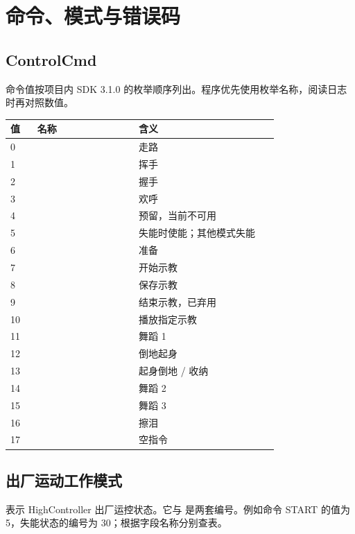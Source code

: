 \chapter{命令、模式与错误码}
\label{app:commands}
\section{ControlCmd}
命令值按项目内 SDK 3.1.0 的枚举顺序列出。程序优先使用枚举名称，阅读日志时再对照数值。

\begingroup\small\renewcommand{\arraystretch}{1.15}
\begin{longtable}{@{}P{0.09\linewidth}P{0.34\linewidth}P{0.47\linewidth}@{}}
\toprule
\textbf{值} & \textbf{名称} & \textbf{含义} \\
\midrule{} &  & 走路 \\
1 &  & 挥手 \\
2 &  & 握手 \\
3 &  & 欢呼 \\
4 &  & 预留，当前不可用 \\
5 &  & 失能时使能；其他模式失能 \\
6 &  & 准备 \\
7 &  & 开始示教 \\
8 &  & 保存示教 \\
9 &  & 结束示教，已弃用 \\
10 &  & 播放指定示教 \\
11 &  & 舞蹈 1 \\
12 &  & 倒地起身 \\
13 &  & 起身倒地 / 收纳 \\
14 &  & 舞蹈 2 \\
15 &  & 舞蹈 3 \\
16 &  & 擦泪 \\
17 &  & 空指令 \\
\bottomrule\end{longtable}\endgroup

\section{出厂运动工作模式}
 表示 HighController 出厂运控状态。它与  是两套编号。例如命令 START 的值为 5，失能状态的编号为 30；根据字段名称分别查表。

